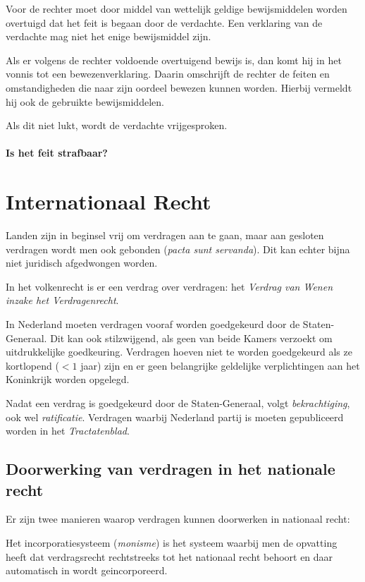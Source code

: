 \documentclass{article}
\begin{document}
Voor de rechter moet door middel van wettelijk geldige bewijsmiddelen worden
overtuigd dat het feit is begaan door de verdachte. Een verklaring van de
verdachte mag niet het enige bewijsmiddel zijn.

Als er volgens de rechter voldoende overtuigend bewijs is, dan komt hij in het
vonnis tot een bewezenverklaring. Daarin omschrijft de rechter de feiten en
omstandigheden die naar zijn oordeel bewezen kunnen worden. Hierbij vermeldt
hij ook de gebruikte bewijsmiddelen.

Als dit niet lukt, wordt de verdachte vrijgesproken.

\paragraph{Is het feit strafbaar?}




\section{Internationaal Recht} \label{h15}

Landen zijn in beginsel vrij om verdragen aan te gaan, maar aan gesloten
verdragen wordt men ook gebonden (\emph{pacta sunt servanda}). Dit kan echter
bijna niet juridisch afgedwongen worden.

In het volkenrecht is er een verdrag over verdragen: het \emph{Verdrag van
Wenen inzake het Verdragenrecht}.

In Nederland moeten verdragen vooraf worden goedgekeurd door de
Staten-Generaal. Dit kan ook stilzwijgend, als geen van beide Kamers verzoekt
om uitdrukkelijke goedkeuring. Verdragen hoeven niet te worden goedgekeurd als
ze kortlopend ($<1$ jaar) zijn en er geen belangrijke geldelijke verplichtingen
aan het Koninkrijk worden opgelegd.

Nadat een verdrag is goedgekeurd door de Staten-Generaal, volgt
\emph{bekrachtiging}, ook wel \emph{ratificatie}. Verdragen waarbij Nederland
partij is moeten gepubliceerd worden in het \emph{Tractatenblad}.

\subsection{Doorwerking van verdragen in het nationale recht}

Er zijn twee manieren waarop verdragen kunnen doorwerken in nationaal recht:

Het incorporatiesysteem (\emph{monisme}) is het systeem waarbij men de opvatting
heeft dat verdragsrecht rechtstreeks tot het nationaal recht behoort en daar
automatisch in wordt geincorporeerd.
\end{document}
